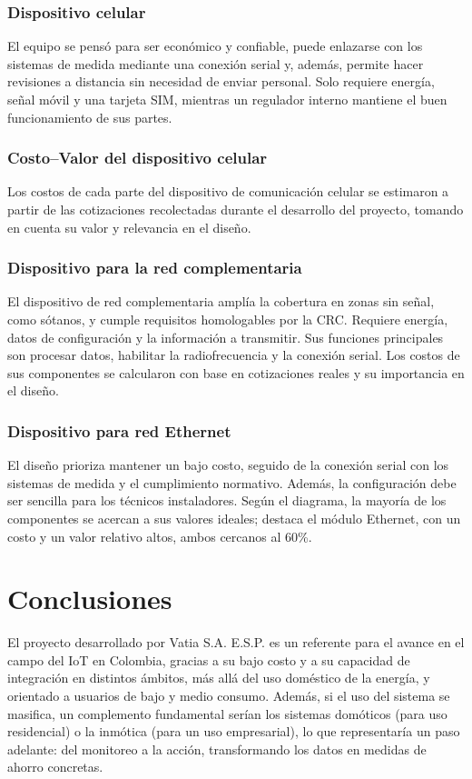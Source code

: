 \subsubsection{Dispositivo celular}
El equipo se pensó para ser económico y confiable, puede enlazarse con los sistemas de medida mediante una conexión serial y, además, permite hacer revisiones a distancia sin necesidad de enviar personal. Solo requiere energía, señal móvil y una tarjeta SIM, mientras un regulador interno mantiene el buen funcionamiento de sus partes.

\subsubsection{Costo–Valor del dispositivo celular}
Los costos de cada parte del dispositivo de comunicación celular se estimaron a partir de las cotizaciones recolectadas durante el desarrollo del proyecto, tomando en cuenta su valor y relevancia en el diseño.

\subsubsection{Dispositivo para la red complementaria}
El dispositivo de red complementaria amplía la cobertura en zonas sin señal, como sótanos, y cumple requisitos homologables por la CRC. Requiere energía, datos de configuración y la información a transmitir. Sus funciones principales son procesar datos, habilitar la radiofrecuencia y la conexión serial. Los costos de sus componentes se calcularon con base en cotizaciones reales y su importancia en el diseño.

\subsubsection{Dispositivo para red Ethernet}
El diseño prioriza mantener un bajo costo, seguido de la conexión serial con los sistemas de medida y el cumplimiento normativo. Además, la configuración debe ser sencilla para los técnicos instaladores. Según el diagrama, la mayoría de los componentes se acercan a sus valores ideales; destaca el módulo Ethernet, con un costo y un valor relativo altos, ambos cercanos al 60\%.

\section{Conclusiones}
El proyecto desarrollado por Vatia S.A. E.S.P. es un referente para el avance en el campo del IoT en Colombia, gracias a su bajo costo y a su capacidad de integración en distintos ámbitos, más allá del uso doméstico de la energía, y orientado a usuarios de bajo y medio consumo. Además, si el uso del sistema se masifica, un complemento fundamental serían los sistemas domóticos (para uso residencial) o la inmótica (para un uso empresarial), lo que representaría un paso adelante: del monitoreo a la acción, transformando los datos en medidas de ahorro concretas. 